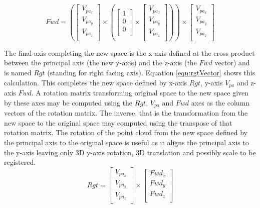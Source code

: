 \begin{equation} \label{eqn:fwdVector}
Fwd = \left(\left[
\begin{array}{c}
V_{pa_{x}}\\
V_{pa_{y}}\\
V_{pa_{z}}\\
\end{array}
\right] \times \left(\left[
\begin{array}{c}
1\\
0\\
0\\
\end{array}
\right] \times \left[
\begin{array}{c}
V_{pa_{x}}\\
V_{pa_{y}}\\
V_{pa_{z}}\\
\end{array}
\right]\right)\right) \times \left[
\begin{array}{c}
V_{pa_{x}}\\
V_{pa_{y}}\\
V_{pa_{z}}\\
\end{array}
\right]
\end{equation}

The final axis completing the new space is the x-axis defined at the cross product between the principal axis (the new y-axis) and the z-axis (the $Fwd$ vector) and is named $Rgt$ (standing for right facing axis). Equation \ref{eqn:rgtVector} shows this calculation. This completes the new space defined by x-axis $Rgt$, y-axis $V_{pa}$ and z-axis $Fwd$. A rotation matrix transforming original space to the new space given by these axes may be computed using the $Rgt$, $V_{pa}$ and $Fwd$ axes as the column vectors of the rotation matrix. The inverse, that is the transformation from the new space to the original space may computed using the transpose of that rotation matrix. The rotation of the point cloud from the new space defined by the principal axis to the original space is useful as it aligns the principal axis to the y-axis leaving only 3D y-axis rotation, 3D translation and possibly scale to be registered. \\ 


\begin{equation} \label{eqn:rgtVector}
Rgt = \left[
\begin{array}{c}
V_{pa_{x}}\\
V_{pa_{y}}\\
V_{pa_{z}}\\
\end{array}
\right] \times \left[
\begin{array}{c}
Fwd_x\\
Fwd_y\\
Fwd_z\\
\end{array}
\right]
\end{equation}

